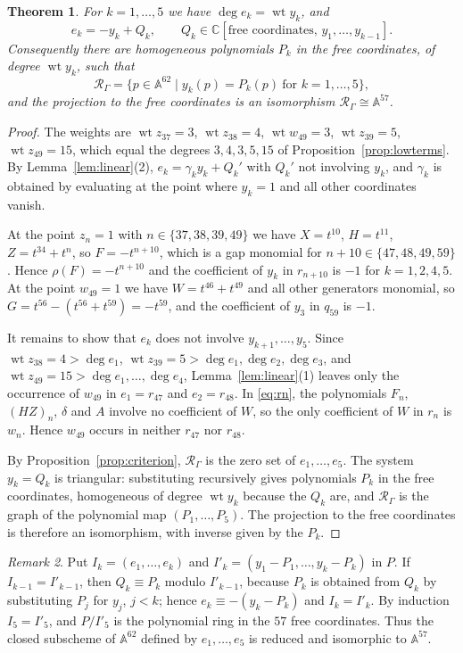 \documentclass{amsart}
\newtheorem{theorem}{Theorem}[section]
\theoremstyle{definition}
\theoremstyle{remark}
\newtheorem{remark}[theorem]{Remark}
\numberwithin{equation}{section}
\newcommand{\CC}{\mathbb{C}}
\newcommand{\AF}{\mathbb{A}}
\newcommand{\Rs}{\mathcal{R}_\Gamma}
\DeclareMathOperator{\wt}{wt}
\begin{document}
\begin{theorem}\label{thm:affine}
For $k=1,\dots,5$ we have $\deg e_k=\wt y_k$, and
\[
e_k=-y_k+Q_k,\qquad Q_k\in\CC[\text{free coordinates},\,y_1,\dots,y_{k-1}].
\]
Consequently there are homogeneous polynomials $P_k$ in the free coordinates, of degree $\wt y_k$, such that
\[
\Rs=\{p\in\AF^{62}\mid y_k(p)=P_k(p)\ \text{for }k=1,\dots,5\},
\]
and the projection to the free coordinates is an isomorphism $\Rs\cong\AF^{57}$.
\end{theorem}

\begin{proof}
The weights are $\wt z_{37}=3$, $\wt z_{38}=4$, $\wt w_{49}=3$, $\wt z_{39}=5$, $\wt z_{49}=15$, which equal the degrees $3,4,3,5,15$ of Proposition~\ref{prop:lowterms}. By Lemma~\ref{lem:linear}(2), $e_k=\gamma_ky_k+Q_k'$ with $Q_k'$ not involving $y_k$, and $\gamma_k$ is obtained by evaluating at the point where $y_k=1$ and all other coordinates vanish.

At the point $z_n=1$ with $n\in\{37,38,39,49\}$ we have $X=t^{10}$, $H=t^{11}$, $Z=t^{34}+t^n$, so $F=-t^{n+10}$, which is a gap monomial for $n+10\in\{47,48,49,59\}$. Hence $\rho(F)=-t^{n+10}$ and the coefficient of $y_k$ in $r_{n+10}$ is $-1$ for $k=1,2,4,5$. At the point $w_{49}=1$ we have $W=t^{46}+t^{49}$ and all other generators monomial, so $G=t^{56}-(t^{56}+t^{59})=-t^{59}$, and the coefficient of $y_3$ in $q_{59}$ is $-1$.

It remains to show that $e_k$ does not involve $y_{k+1},\dots,y_5$. Since $\wt z_{38}=4>\deg e_1$, $\wt z_{39}=5>\deg e_1,\deg e_2,\deg e_3$, and $\wt z_{49}=15>\deg e_1,\dots,\deg e_4$, Lemma~\ref{lem:linear}(1) leaves only the occurrence of $w_{49}$ in $e_1=r_{47}$ and $e_2=r_{48}$. In \eqref{eq:rn}, the polynomials $F_n$, $(HZ)_n$, $\delta$ and $A$ involve no coefficient of $W$, so the only coefficient of $W$ in $r_n$ is $w_n$. Hence $w_{49}$ occurs in neither $r_{47}$ nor $r_{48}$.

By Proposition~\ref{prop:criterion}, $\Rs$ is the zero set of $e_1,\dots,e_5$. The system $y_k=Q_k$ is triangular: substituting recursively gives polynomials $P_k$ in the free coordinates, homogeneous of degree $\wt y_k$ because the $Q_k$ are, and $\Rs$ is the graph of the polynomial map $(P_1,\dots,P_5)$. The projection to the free coordinates is therefore an isomorphism, with inverse given by the $P_k$.
\end{proof}

\begin{remark}\label{rem:scheme}
Put $I_k=(e_1,\dots,e_k)$ and $I'_k=(y_1-P_1,\dots,y_k-P_k)$ in $P$. If $I_{k-1}=I'_{k-1}$, then $Q_k\equiv P_k$ modulo $I'_{k-1}$, because $P_k$ is obtained from $Q_k$ by substituting $P_j$ for $y_j$, $j<k$; hence $e_k\equiv-(y_k-P_k)$ and $I_k=I'_k$. By induction $I_5=I'_5$, and $P/I'_5$ is the polynomial ring in the $57$ free coordinates. Thus the closed subscheme of $\AF^{62}$ defined by $e_1,\dots,e_5$ is reduced and isomorphic to $\AF^{57}$.
\end{remark}
\end{document}
